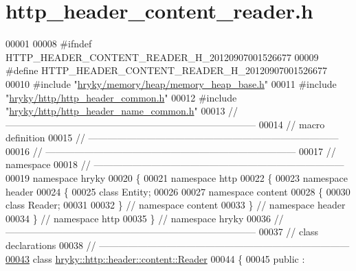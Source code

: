 \hypertarget{http__header__content__reader_8h_source}{\section{http\-\_\-header\-\_\-content\-\_\-reader.\-h}
}

\begin{DoxyCode}
00001 
00008 \textcolor{preprocessor}{#ifndef HTTP\_HEADER\_CONTENT\_READER\_H\_20120907001526677}
00009 \textcolor{preprocessor}{}\textcolor{preprocessor}{#define HTTP\_HEADER\_CONTENT\_READER\_H\_20120907001526677}
00010 \textcolor{preprocessor}{}\textcolor{preprocessor}{#include "\hyperlink{memory__heap__base_8h}{hryky/memory/heap/memory_heap_base.h}"}
00011 \textcolor{preprocessor}{#include "\hyperlink{http__header__common_8h}{hryky/http/http_header_common.h}"}
00012 \textcolor{preprocessor}{#include "\hyperlink{http__header__name__common_8h}{hryky/http/http_header_name_common.h}"}
00013 \textcolor{comment}{//
      ------------------------------------------------------------------------------}
00014 \textcolor{comment}{// macro definition}
00015 \textcolor{comment}{//
      ------------------------------------------------------------------------------}
00016 \textcolor{comment}{//
      ------------------------------------------------------------------------------}
00017 \textcolor{comment}{// namespace}
00018 \textcolor{comment}{//
      ------------------------------------------------------------------------------}
00019 \textcolor{keyword}{namespace }hryky
00020 \{
00021 \textcolor{keyword}{namespace }http
00022 \{
00023 \textcolor{keyword}{namespace }header
00024 \{
00025     \textcolor{keyword}{class }Entity;
00026 
00027 \textcolor{keyword}{namespace }content
00028 \{
00030     \textcolor{keyword}{class }Reader;
00031 
00032 \} \textcolor{comment}{// namespace content}
00033 \} \textcolor{comment}{// namespace header}
00034 \} \textcolor{comment}{// namespace http}
00035 \} \textcolor{comment}{// namespace hryky}
00036 \textcolor{comment}{//
      ------------------------------------------------------------------------------}
00037 \textcolor{comment}{// class declarations}
00038 \textcolor{comment}{//
      ------------------------------------------------------------------------------}
\hypertarget{http__header__content__reader_8h_source_l00043}{}\hyperlink{classhryky_1_1http_1_1header_1_1content_1_1_reader}{00043} \textcolor{comment}{}\textcolor{keyword}{class }\hyperlink{classhryky_1_1http_1_1header_1_1content_1_1_reader}{hryky::http::header::content::Reader}
00044 \{
00045 \textcolor{keyword}{public} :

\end{DoxyCode}
